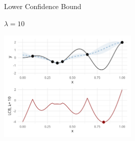 \documentclass[11pt,compress,t,notes=noshow, xcolor=table]{beamer}
\begin{document}
\begin{vbframe}{Lower Confidence Bound}
\framebreak

$\lambda = 10$

\begin{center}
  \includegraphics[width = 0.5\textwidth]{figure_man/bayesian_loop_lcb_2.png}
\end{center}

\end{vbframe}
\end{document}
